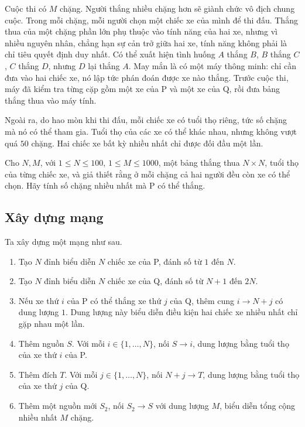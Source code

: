 \documentclass[11pt]{article}
\begin{document}
Cuộc thi có \(M\) chặng. Người thắng nhiều chặng hơn sẽ giành chức vô địch
chung cuộc. Trong mỗi chặng, mỗi người chọn một chiếc xe của mình để thi đấu.
Thắng thua của một chặng phần lớn phụ thuộc vào tính năng của hai xe, nhưng
vì nhiều nguyên nhân, chẳng hạn sự cản trở giữa hai xe, tính năng không phải
là chỉ tiêu quyết định duy nhất. Có thể xuất hiện tình huống \(A\) thắng
\(B\), \(B\) thắng \(C\), \(C\) thắng \(D\), nhưng \(D\) lại thắng \(A\).
May mắn là có một máy thông minh: chỉ cần đưa vào hai chiếc xe, nó lập tức
phán đoán được xe nào thắng. Trước cuộc thi, máy đã kiểm tra từng cặp gồm một
xe của P và một xe của Q, rồi đưa bảng thắng thua vào máy tính.

Ngoài ra, do hao mòn khi thi đấu, mỗi chiếc xe có tuổi thọ riêng, tức số
chặng mà nó có thể tham gia. Tuổi thọ của các xe có thể khác nhau, nhưng
không vượt quá \(50\) chặng. Hai chiếc xe bất kỳ nhiều nhất chỉ được đối đầu
một lần.

Cho \(N,M\), với \(1\le N\le 100\), \(1\le M\le 1000\), một bảng thắng thua
\(N\times N\), tuổi thọ của từng chiếc xe, và giả thiết rằng ở mỗi chặng cả
hai người đều còn xe có thể chọn. Hãy tính số chặng nhiều nhất mà P có thể
thắng.

\subsection{Xây dựng mạng}

Ta xây dựng một mạng như sau.

\begin{enumerate}
  \item Tạo \(N\) đỉnh biểu diễn \(N\) chiếc xe của P, đánh số từ \(1\) đến
  \(N\).
  \item Tạo \(N\) đỉnh biểu diễn \(N\) chiếc xe của Q, đánh số từ \(N+1\)
  đến \(2N\).
  \item Nếu xe thứ \(i\) của P có thể thắng xe thứ \(j\) của Q, thêm cung
  \(i\to N+j\) có dung lượng \(1\). Dung lượng này biểu diễn điều kiện hai
  chiếc xe nhiều nhất chỉ gặp nhau một lần.
  \item Thêm nguồn \(S\). Với mỗi \(i\in\{1,\ldots,N\}\), nối
  \(S\to i\), dung lượng bằng tuổi thọ của xe thứ \(i\) của P.
  \item Thêm đích \(T\). Với mỗi \(j\in\{1,\ldots,N\}\), nối
  \(N+j\to T\), dung lượng bằng tuổi thọ của xe thứ \(j\) của Q.
  \item Thêm một nguồn mới \(S_2\), nối \(S_2\to S\) với dung lượng \(M\),
  biểu diễn tổng cộng nhiều nhất \(M\) chặng.
\end{enumerate}
\end{document}
